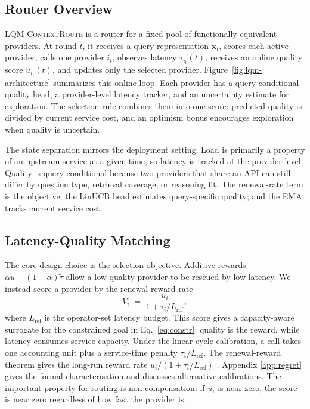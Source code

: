 \documentclass[11pt]{article}
\newcommand{\lqmcr}{\textsc{LQM-ContextRoute}}
\begin{document}
\subsection{Router Overview}
\lqmcr{} is a router for a fixed pool of functionally equivalent providers. At round $t$, it receives a query representation $\mathbf{x}_t$, scores each active provider, calls one provider $i_t$, observes latency $\tau_{i_t}(t)$, receives an online quality score $u_{i_t}(t)$, and updates only the selected provider. Figure~\ref{fig:lqm-architecture} summarizes this online loop. Each provider has a query-conditional quality head, a provider-level latency tracker, and an uncertainty estimate for exploration. The selection rule combines them into one score: predicted quality is divided by current service cost, and an optimism bonus encourages exploration when quality is uncertain.

The state separation mirrors the deployment setting. Load is primarily a property of an upstream service at a given time, so latency is tracked at the provider level. Quality is query-conditional because two providers that share an API can still differ by question type, retrieval coverage, or reasoning fit. The renewal-rate term is the objective; the LinUCB head estimates query-specific quality; and the EMA tracks current service cost.

\subsection{Latency-Quality Matching}
\label{sec:method-derivation}

The core design choice is the selection objective. Additive rewards $\alpha u-(1{-}\alpha)\tilde{\tau}$ allow a low-quality provider to be rescued by low latency. We instead score a provider by the renewal-reward rate
\begin{equation}
\label{eq:renewal}
  V_i \;=\; \frac{u_i}{1 + \tau_i / L_{\text{ref}}},
\end{equation}
where $L_{\text{ref}}$ is the operator-set latency budget. This score gives a capacity-aware surrogate for the constrained goal in Eq.~\ref{eq:constr}: quality is the reward, while latency consumes service capacity. Under the linear-cycle calibration, a call takes one accounting unit plus a service-time penalty $\tau_i/L_{\text{ref}}$. The renewal-reward theorem gives the long-run reward rate $u_i/(1+\tau_i/L_{\text{ref}})$ \citep[Thm.\ 3.6.1]{ross1996stochastic}. Appendix \ref{app:regret} gives the formal characterisation and discusses alternative calibrations. The important property for routing is non-compensation: if $u_i$ is near zero, the score is near zero regardless of how fast the provider is.
\end{document}
